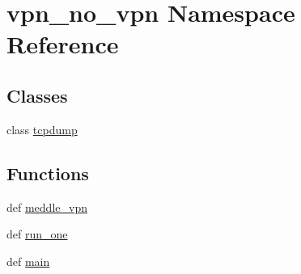 \hypertarget{namespacevpn__no__vpn}{\section{vpn\-\_\-no\-\_\-vpn Namespace Reference}
\label{namespacevpn__no__vpn}
}
\subsection*{Classes}
\begin{DoxyCompactItemize}
\item 
class \hyperlink{classvpn__no__vpn_1_1tcpdump}{tcpdump}
\end{DoxyCompactItemize}
\subsection*{Functions}
\begin{DoxyCompactItemize}
\item 
def \hyperlink{namespacevpn__no__vpn_a1119e982dc3f687c8bb0edb1e9953354}{meddle\-\_\-vpn}
\item 
def \hyperlink{namespacevpn__no__vpn_a4da84311848fe51d8b56d51c475b4291}{run\-\_\-one}
\item 
def \hyperlink{namespacevpn__no__vpn_a31941e50267268cccab158e35a4e7fde}{main}
\end{DoxyCompactItemize}


